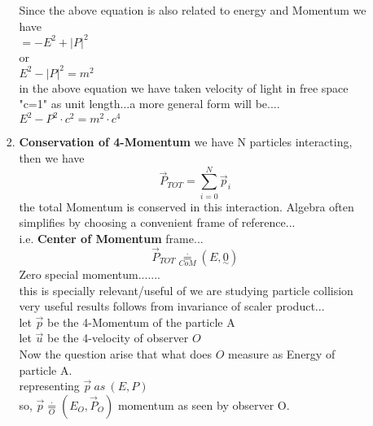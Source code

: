 \documentclass[11pt,a4paper]{article}
\begin{document}
\begin{enumerate}
\begin{enumerate}
\begin{enumerate}
                                    Since the above equation is also related to energy and Momentum we have\\
                                    $=-E^2 + \lvert P \rvert^2$\\
                                    or \\
                                    $E^2 - \lvert P \rvert^2 = m^2$\\
                                    in the above equation we have taken velocity of light in free space "c=1" as unit length...a more general form will be....\\
                                    $E^2 -  P^2 \cdot c^2= m^2\cdot c^4$\\
                              \item \textbf{Conservation of 4-Momentum}\newline
                                    we have N particles interacting, then we have
                                    \[\vec{P}_{TOT}= \sum_{i=0}^{N}\vec{p}_{i}\]
                                    the total Momentum is conserved in this interaction.
                                    Algebra often simplifies by choosing a convenient frame of reference...\\
                                    i.e. \textbf{Center of Momentum} frame...\\
                                    \[\vec{P}_{TOT} \mathop = \limits^{\cdot}_{CoM} (E,\underset{\sim}{0})\]
                                    Zero special momentum.......\\
                                    this is specially relevant/useful of we are studying particle collision\\
                                    very useful results follows from invariance of scaler product...\\
                                    let $\vec{p}$ be the 4-Momentum of the particle A\\
                                    let $\vec{u}$ be the 4-velocity of observer $O$\\
                                    Now the question arise that what does $O$ measure as Energy of particle A.\\
                                    representing $\vec{p}\ as \ (E,P)$\\
                                    so, $\vec{p} \mathop = \limits^{\cdot}_{O} (E_{O},\vec{P}_{O})$ momentum as seen by observer O.\\

\end{enumerate}
\end{enumerate}
\end{enumerate}
\end{document}
